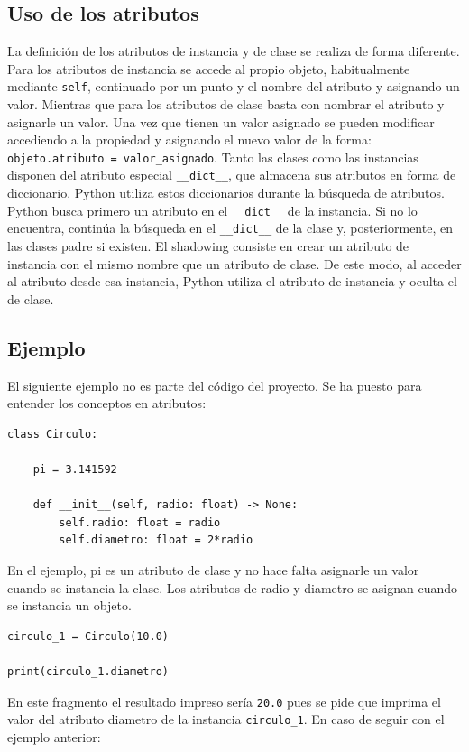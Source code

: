 \documentclass[11pt,a5paper,twoside]{book}
\begin{document}
\subsection{Uso de los atributos}
La definición de los atributos de instancia y de clase se realiza de forma diferente. Para los atributos de instancia se accede al propio objeto, habitualmente mediante {\scriptsize \texttt{self}}, continuado por un punto y el nombre del atributo y asignando un valor. Mientras que para los atributos de clase basta con nombrar el atributo y asignarle un valor.
Una vez que tienen un valor asignado se pueden modificar accediendo a la propiedad y asignando el nuevo valor de la forma: {\scriptsize \texttt{objeto.atributo = valor\_asignado}}.
Tanto las clases como las instancias disponen del atributo especial {\scriptsize \texttt{\_\_dict\_\_}}, que almacena sus atributos en forma de diccionario. Python utiliza estos diccionarios durante la búsqueda de atributos.
Python busca primero un atributo en el {\scriptsize \texttt{\_\_dict\_\_}} de la instancia. Si no lo encuentra, continúa la búsqueda en el {\scriptsize \texttt{\_\_dict\_\_}} de la clase y, posteriormente, en las clases padre si existen.
El shadowing consiste en crear un atributo de instancia con el mismo nombre que un atributo de clase. De este modo, al acceder al atributo desde esa instancia, Python utiliza el atributo de instancia y oculta el de clase.
\subsection{Ejemplo}
El siguiente ejemplo no es parte del código del proyecto. Se ha puesto para entender los conceptos en atributos:


\begin{tcolorbox}
\scriptsize
 \begin{verbatim}
class Circulo:
    
    pi = 3.141592
    
    def __init__(self, radio: float) -> None:
        self.radio: float = radio
        self.diametro: float = 2*radio

\end{verbatim}
\end{tcolorbox}
En el ejemplo, pi es un atributo de clase y no hace falta asignarle un valor cuando se instancia la clase.
Los atributos de radio y diametro se asignan cuando se instancia un objeto.


\begin{tcolorbox}
\scriptsize
 \begin{verbatim}
circulo_1 = Circulo(10.0)

print(circulo_1.diametro)

\end{verbatim}
\end{tcolorbox}
En este fragmento el resultado impreso sería {\scriptsize \texttt{20.0}} pues se pide que imprima el valor del atributo diametro de la instancia {\scriptsize \texttt{circulo\_1}}.
En caso de seguir con el ejemplo anterior:
\end{document}
